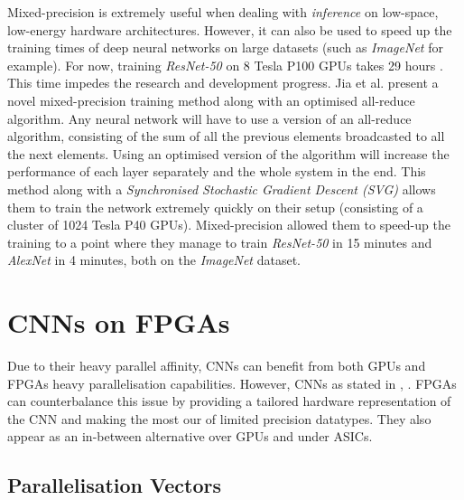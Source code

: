 Mixed-precision is extremely useful when dealing with \emph{inference} on low-space, low-energy hardware architectures. However, it can also be used to speed up the training times of deep neural networks on large datasets (such as \emph{ImageNet} for example). For now, training \emph{ResNet-50} on 8 Tesla P100 GPUs takes 29 hours \cite{He2016}. This time  impedes the research and development progress. Jia et al. \cite{Jia2018} present a novel mixed-precision training method along with an optimised all-reduce algorithm. Any neural network will have to use a version of an all-reduce algorithm, consisting of the sum of all the previous elements broadcasted to all the next elements. Using an optimised version of the algorithm will increase the performance of each layer separately and the whole system in the end. This method along with a \emph{Synchronised Stochastic Gradient Descent (SVG)} allows them to train the network extremely quickly on their setup (consisting of a cluster of 1024 Tesla P40 GPUs). Mixed-precision allowed them to speed-up the training to a point where they manage to train \emph{ResNet-50} in 15 minutes and \emph{AlexNet} in 4 minutes, both on the \emph{ImageNet} dataset.



\section{CNNs on FPGAs}

Due to their heavy parallel affinity, CNNs can benefit from both GPUs \cite{Micikevicius2017, Jia2018, Kurth2018} and FPGAs \cite{Park2016, Liang2017, Colangelo2018, Jahanshahi2019, Bacchus2020} heavy parallelisation capabilities.
However, CNNs as stated in \cite{Jahanshahi2019}, . FPGAs can counterbalance this issue by providing a tailored hardware representation of the CNN and making the most our of limited precision datatypes. They also appear as an in-between alternative over GPUs and under ASICs.


\subsection{Parallelisation Vectors}

